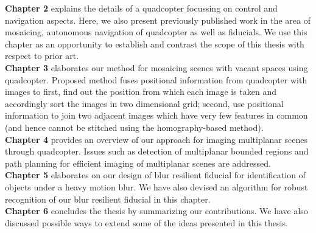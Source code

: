 \noindent \textbf{Chapter 2} explains the details of a quadcopter focussing on
control and navigation aspects. Here, we also present previously published work
in the area of mosaicing, autonomous navigation of quadcopter as well as
fiducials. We use this chapter as an opportunity to establish and contrast the
scope of this thesis with respect to prior art.\\

\noindent \textbf{Chapter 3} elaborates our method for mosaicing
scenes with vacant spaces using quadcopter. Proposed method fuses positional
information from quadcopter with images to first, find out the position from which each
image is taken and accordingly sort the images in two dimensional grid; second,
use positional information to join two adjacent images which have very few features
in common (and hence cannot be stitched using the homography-based method).\\

\noindent \textbf{Chapter 4} provides an overview of our approach
for imaging multiplanar scenes through quadcopter. Issues such as detection of
multiplanar bounded regions and path planning for efficient imaging of multiplanar scenes
are addressed.\\

\noindent \textbf{Chapter 5} elaborates on our design of blur
resilient fiducial for identification of objects under a heavy motion blur. We
have also devised an algorithm for robust recognition of our blur resilient
fiducial in this chapter.\\
 
 \noindent \textbf{Chapter 6} concludes the thesis by summarizing our
 contributions. We have also discussed possible ways to extend some of the
 ideas presented in this thesis.
